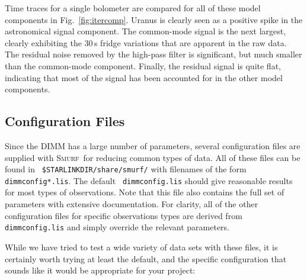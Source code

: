 \documentclass[twoside,11pt]{article}
\newcommand{\xref}[3]{#1}
\newcommand{\xlabel}[1]{}
\renewcommand{\_}{\texttt{\symbol{95}}}
\newcommand{\smurf}{\xref{\textsc{Smurf}}{sun258}{}}
\begin{document}
Time traces for a single bolometer are compared for all of these model
components in Fig.~\ref{fig:itercomp}. Uranus is clearly seen as a
positive spike in the astronomical signal component. The common-mode
signal is the next largest, clearly exhibiting the 30\,s fridge
variations that are apparent in the raw data. The residual noise
removed by the high-pass filter is significant, but much smaller than
the common-mode component. Finally, the residual signal is quite flat,
indicating that most of the signal has been accounted for in the other
model components.

\subsection{\xlabel{config}Configuration Files}

Since the DIMM has a large number of parameters, several configuration
files are supplied with \smurf\ for reducing common types of data. All
of these files can be found in \texttt{ \$STARLINK\_DIR/share/smurf/}
with filenames of the form \texttt{ dimmconfig*.lis}. The default
\texttt{ dimmconfig.lis} should give reasonable results for most types
of observations. Note that this file also contains the full set of
parameters with extensive documentation. For clarity, all of the other
configuration files for specific observations types are derived from
\texttt{ dimmconfig.lis} and simply override the relevant
parameters.

While we have tried to test a wide variety of data sets with these
files, it is certainly worth trying at least the default, and the
specific configuration that sounds like it would be appropriate for
your project:
\end{document}
